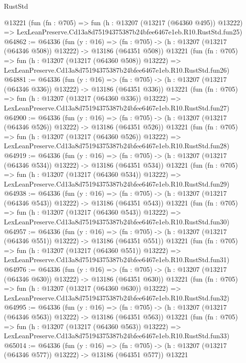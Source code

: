 \begin{lexlean}{RustStd}
\begin{coremodule}
    @13221
    (fun (fn : @705) =>
    fun (h : @13207 (@13217 (@64360 @495)) @13222) =>
    LexLeanPreserve.Cd13a8d75194375387b24bfee6467e1eb.R10.RustStd.fun25)
@64862 := @64336
    (fun (y : @16) =>
    (fn : @705) -> (h : @13207 (@13217 (@64346 @508)) @13222) -> @13186 (@64351 @508))
    @13221
    (fun (fn : @705) =>
    fun (h : @13207 (@13217 (@64360 @508)) @13222) =>
    LexLeanPreserve.Cd13a8d75194375387b24bfee6467e1eb.R10.RustStd.fun26)
@64881 := @64336
    (fun (y : @16) =>
    (fn : @705) -> (h : @13207 (@13217 (@64346 @336)) @13222) -> @13186 (@64351 @336))
    @13221
    (fun (fn : @705) =>
    fun (h : @13207 (@13217 (@64360 @336)) @13222) =>
    LexLeanPreserve.Cd13a8d75194375387b24bfee6467e1eb.R10.RustStd.fun27)
@64900 := @64336
    (fun (y : @16) =>
    (fn : @705) -> (h : @13207 (@13217 (@64346 @526)) @13222) -> @13186 (@64351 @526))
    @13221
    (fun (fn : @705) =>
    fun (h : @13207 (@13217 (@64360 @526)) @13222) =>
    LexLeanPreserve.Cd13a8d75194375387b24bfee6467e1eb.R10.RustStd.fun28)
@64919 := @64336
    (fun (y : @16) =>
    (fn : @705) -> (h : @13207 (@13217 (@64346 @534)) @13222) -> @13186 (@64351 @534))
    @13221
    (fun (fn : @705) =>
    fun (h : @13207 (@13217 (@64360 @534)) @13222) =>
    LexLeanPreserve.Cd13a8d75194375387b24bfee6467e1eb.R10.RustStd.fun29)
@64938 := @64336
    (fun (y : @16) =>
    (fn : @705) -> (h : @13207 (@13217 (@64346 @543)) @13222) -> @13186 (@64351 @543))
    @13221
    (fun (fn : @705) =>
    fun (h : @13207 (@13217 (@64360 @543)) @13222) =>
    LexLeanPreserve.Cd13a8d75194375387b24bfee6467e1eb.R10.RustStd.fun30)
@64957 := @64336
    (fun (y : @16) =>
    (fn : @705) -> (h : @13207 (@13217 (@64346 @551)) @13222) -> @13186 (@64351 @551))
    @13221
    (fun (fn : @705) =>
    fun (h : @13207 (@13217 (@64360 @551)) @13222) =>
    LexLeanPreserve.Cd13a8d75194375387b24bfee6467e1eb.R10.RustStd.fun31)
@64976 := @64336
    (fun (y : @16) =>
    (fn : @705) -> (h : @13207 (@13217 (@64346 @630)) @13222) -> @13186 (@64351 @630))
    @13221
    (fun (fn : @705) =>
    fun (h : @13207 (@13217 (@64360 @630)) @13222) =>
    LexLeanPreserve.Cd13a8d75194375387b24bfee6467e1eb.R10.RustStd.fun32)
@64995 := @64336
    (fun (y : @16) =>
    (fn : @705) -> (h : @13207 (@13217 (@64346 @563)) @13222) -> @13186 (@64351 @563))
    @13221
    (fun (fn : @705) =>
    fun (h : @13207 (@13217 (@64360 @563)) @13222) =>
    LexLeanPreserve.Cd13a8d75194375387b24bfee6467e1eb.R10.RustStd.fun33)
@65014 := @64336
    (fun (y : @16) =>
    (fn : @705) -> (h : @13207 (@13217 (@64346 @577)) @13222) -> @13186 (@64351 @577))
    @13221

\end{coremodule}
\end{lexlean}
